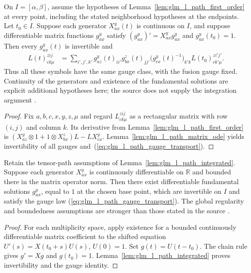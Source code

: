 \begin{lemma}
    \leanok
    \label{lem:glm_l_path_integrated}
    On $I=[\alpha,\beta]$, assume the hypotheses of
    Lemma~\ref{lem:glm_l_path_first_order} at every point, including the
    stated neighborhood hypotheses at the endpoints. Let $t_0\in I$.
    Suppose each generator $X_{ax}^y(t)$ is continuous on $I$, and suppose
    differentiable matrix functions $g_{ax}^y$ satisfy
    $(g_{ax}^y)'=X_{ax}^y g_{ax}^y$ and $g_{ax}^y(t_0)=1$.
    Then every $g_{ax}^y(t)$ is invertible and
    \begin{align}
        L(t)^{zij}_{ck\mu}
         & =\sum_{i',j',k'}
        g_{az}^y(t)_{ii'}g_{bx}^z(t)_{jj'}
        \bigl(g_{cx}^y(t)^{-1}\bigr)_{k'k}
        L(t_0)^{zi'j'}_{ck'\mu}.
        \label{eq:glm_l_path_gauge_transport}
    \end{align}
    Thus all these symbols have the same gauge class, with the fusion
    gauge fixed. Continuity of the generators and existence of the
    fundamental solutions are explicit additional hypotheses here;
    the source does not supply the integration argument
    \cite{gap:glm23_mpo_symmetric_mps_scope}.
\end{lemma}
\begin{proof}
    \leanok
    Fix $a,b,c,x,y,z,\mu$ and regard $L^{zij}_{ck\mu}$ as a rectangular
    matrix with row $(i,j)$ and column $k$. Its derivative from
    Lemma~\ref{lem:glm_l_path_first_order} is
    $(X_{az}^y\otimes1+1\otimes X_{bx}^z)L-LX_{cx}^y$.
    Lemma~\ref{lem:glm_l_path_matrix_ode} yields invertibility of all
    gauges and~(\ref{eq:glm_l_path_gauge_transport}).
\end{proof}


\begin{lemma}
    \leanok
    \label{lem:glm_l_path_constructed}
    Retain the tensor-path assumptions of
    Lemma~\ref{lem:glm_l_path_integrated}. Suppose each generator
    $X_{ax}^y$ is continuously differentiable on $\mathbb R$ and bounded
    there in the matrix operator norm. Then there exist differentiable
    fundamental solutions $g_{ax}^y$, equal to $1$ at the chosen base
    point, which are invertible on $I$ and satisfy the gauge law
    (\ref{eq:glm_l_path_gauge_transport}). The global regularity and
    boundedness assumptions are stronger than those stated in the source
    \cite{gap:glm23_mpo_symmetric_mps_scope}.
\end{lemma}
\begin{proof}
    \leanok
    For each multiplicity space, apply existence for a bounded
    continuously differentiable matrix coefficient to the shifted equation
    $U'(s)=X(t_0+s)U(s)$, $U(0)=1$. Set $g(t)=U(t-t_0)$.
    The chain rule gives $g'=Xg$ and $g(t_0)=1$.
    Lemma~\ref{lem:glm_l_path_integrated} proves invertibility and the
    gauge identity.
\end{proof}
